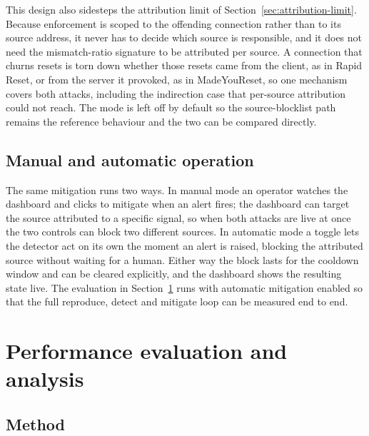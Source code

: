 \documentclass[a4paper,fleqn]{cas-dc}
\begin{document}
This design also sidesteps the attribution limit of Section~\ref{sec:attribution-limit}. Because enforcement is scoped to the offending connection rather than to its source address, it never has to decide which source is responsible, and it does not need the mismatch-ratio signature to be attributed per source. A connection that churns resets is torn down whether those resets came from the client, as in Rapid Reset, or from the server it provoked, as in MadeYouReset, so one mechanism covers both attacks, including the indirection case that per-source attribution could not reach. The mode is left off by default so the source-blocklist path remains the reference behaviour and the two can be compared directly.

\subsection{Manual and automatic operation}\label{sec:mitigation-modes}

The same mitigation runs two ways. In manual mode an operator watches the dashboard and clicks to mitigate when an alert fires; the dashboard can target the source attributed to a specific signal, so when both attacks are live at once the two controls can block two different sources. In automatic mode a toggle lets the detector act on its own the moment an alert is raised, blocking the attributed source without waiting for a human. Either way the block lasts for the cooldown window and can be cleared explicitly, and the dashboard shows the resulting state live. The evaluation in Section~\ref{sec:evaluation} runs with automatic mitigation enabled so that the full reproduce, detect and mitigate loop can be measured end to end.


\section{Performance evaluation and analysis}\label{sec:evaluation}

\subsection{Method}\label{sec:eval-method}
\end{document}
